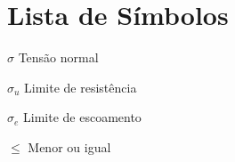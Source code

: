 \chapter*{Lista de Símbolos}
\begin{acronym}[xxxxxxxxx]
    
  \item[$ \sigma  $] Tensão normal
  \item[$ \sigma_{u}  $] Limite de resistência
  \item[$ \sigma_{e}  $] Limite de escoamento


  \item[$\leq$] Menor ou igual
\end{acronym}